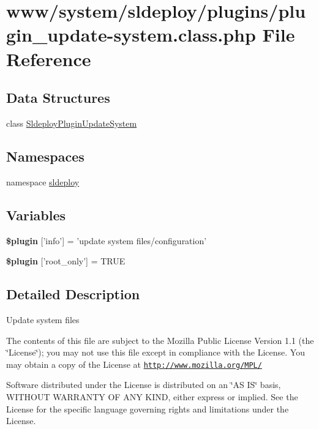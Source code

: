 \hypertarget{plugin__update-system_8class_8php}{
\section{www/system/sldeploy/plugins/plugin\_\-update-\/system.class.php File Reference}
\label{plugin__update-system_8class_8php}
}
\subsection*{Data Structures}
\begin{DoxyCompactItemize}
\item 
class \hyperlink{class_sldeploy_plugin_update_system}{SldeployPluginUpdateSystem}
\end{DoxyCompactItemize}
\subsection*{Namespaces}
\begin{DoxyCompactItemize}
\item 
namespace \hyperlink{namespacesldeploy}{sldeploy}
\end{DoxyCompactItemize}
\subsection*{Variables}
\begin{DoxyCompactItemize}
\item 
\hypertarget{plugin__update-system_8class_8php_a95edf69ebbeaeedb03bab3bb010f2af9}{
{\bfseries \$plugin} \mbox{[}'info'\mbox{]} = 'update system files/configuration'}
\label{plugin__update-system_8class_8php_a95edf69ebbeaeedb03bab3bb010f2af9}

\item 
\hypertarget{plugin__update-system_8class_8php_a1d302084fa15e3efe6c843cbb5096985}{
{\bfseries \$plugin} \mbox{[}'root\_\-only'\mbox{]} = TRUE}
\label{plugin__update-system_8class_8php_a1d302084fa15e3efe6c843cbb5096985}

\end{DoxyCompactItemize}


\subsection{Detailed Description}
Update system files

The contents of this file are subject to the Mozilla Public License Version 1.1 (the \char`\"{}License\char`\"{}); you may not use this file except in compliance with the License. You may obtain a copy of the License at \href{http://www.mozilla.org/MPL/}{\tt http://www.mozilla.org/MPL/}

Software distributed under the License is distributed on an \char`\"{}AS IS\char`\"{} basis, WITHOUT WARRANTY OF ANY KIND, either express or implied. See the License for the specific language governing rights and limitations under the License. 